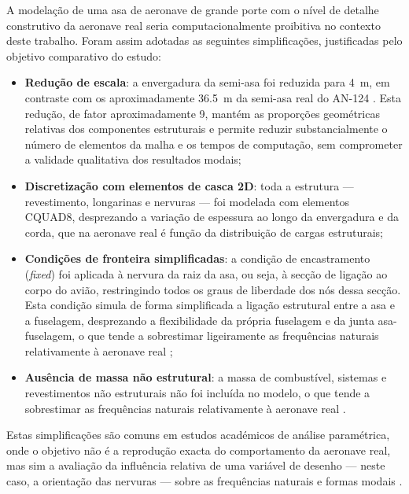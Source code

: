 \documentclass[11pt,twoside,a4paper]{report}
\begin{document}
A modelação de uma asa de aeronave de grande porte com o nível de detalhe construtivo da aeronave real seria computacionalmente proibitiva no contexto deste trabalho. Foram assim adotadas as seguintes simplificações, justificadas pelo objetivo comparativo do estudo:

\begin{itemize}
    \item \textbf{Redução de escala}: a envergadura da semi-asa foi reduzida para \SI{4}{\meter}, em contraste com os aproximadamente \SI{36.5}{\meter} da semi-asa real do AN-124 \cite{Antonov2004}. Esta redução, de fator aproximadamente 9, mantém as proporções geométricas relativas dos componentes estruturais e permite reduzir substancialmente o número de elementos da malha e os tempos de computação, sem comprometer a validade qualitativa dos resultados modais;

    \item \textbf{Discretização com elementos de casca 2D}: toda a estrutura --- revestimento, longarinas e nervuras --- foi modelada com elementos CQUAD8, desprezando a variação de espessura ao longo da envergadura e da corda, que na aeronave real é função da distribuição de cargas estruturais;

    \item \textbf{Condições de fronteira simplificadas}: a condição de encastramento (\textit{fixed}) foi aplicada à nervura da raiz da asa, ou seja, à secção de ligação ao corpo do avião, restringindo todos os graus de liberdade dos nós dessa secção. Esta condição simula de forma simplificada a ligação estrutural entre a asa e a fuselagem, desprezando a flexibilidade da própria fuselagem e da junta asa-fuselagem, o que tende a sobrestimar ligeiramente as frequências naturais relativamente à aeronave real \cite{Wright2015, Hodges2011};

    \item \textbf{Ausência de massa não estrutural}: a massa de combustível, sistemas e revestimentos não estruturais não foi incluída no modelo, o que tende a sobrestimar as frequências naturais relativamente à aeronave real \cite{Wright2015}.
\end{itemize}

Estas simplificações são comuns em estudos académicos de análise paramétrica, onde o objetivo não é a reprodução exacta do comportamento da aeronave real, mas sim a avaliação da influência relativa de uma variável de desenho --- neste caso, a orientação das nervuras --- sobre as frequências naturais e formas modais \cite{Dowell2004}.
\end{document}
